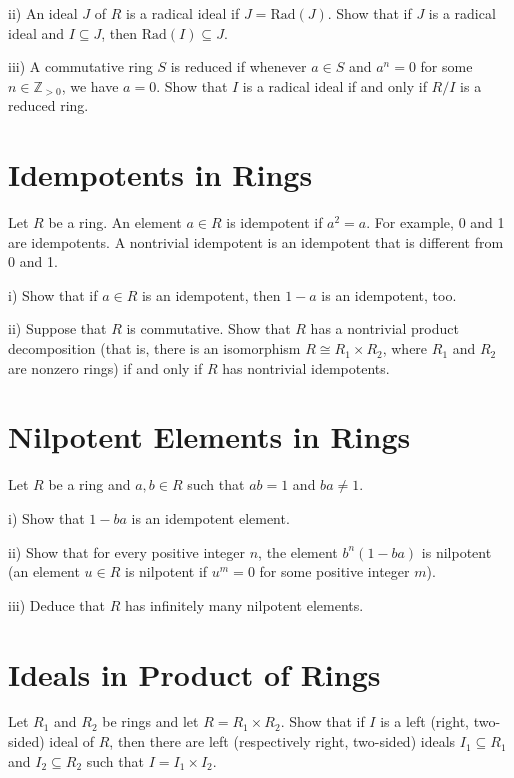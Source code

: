 \documentclass[lang=cn,11pt]{template}
\begin{document}
ii) An ideal \( J \) of \( R \) is a radical ideal if \( J = \text{Rad}(J) \). Show that if \( J \) is a radical ideal and \( I \subseteq J \), then \( \text{Rad}(I) \subseteq J \).

iii) A commutative ring \( S \) is reduced if whenever \( a \in S \) and \( a^n = 0 \) for some \( n \in \mathbb{Z}_{>0} \), we have \( a = 0 \). Show that \( I \) is a radical ideal if and only if \( R/I \) is a reduced ring.

\section{Idempotents in Rings}
Let \( R \) be a ring. An element \( a \in R \) is idempotent if \( a^2 = a \). For example, 0 and 1 are idempotents. A nontrivial idempotent is an idempotent that is different from 0 and 1.

i) Show that if \( a \in R \) is an idempotent, then \( 1 - a \) is an idempotent, too.

ii) Suppose that \( R \) is commutative. Show that \( R \) has a nontrivial product decomposition (that is, there is an isomorphism \( R \cong R_1 \times R_2 \), where \( R_1 \) and \( R_2 \) are nonzero rings) if and only if \( R \) has nontrivial idempotents.

\section{Nilpotent Elements in Rings}
Let \( R \) be a ring and \( a, b \in R \) such that \( ab = 1 \) and \( ba \neq 1 \).

i) Show that \( 1 - ba \) is an idempotent element.

ii) Show that for every positive integer \( n \), the element \( b^n(1 - ba) \) is nilpotent (an element \( u \in R \) is nilpotent if \( u^m = 0 \) for some positive integer \( m \)).

iii) Deduce that \( R \) has infinitely many nilpotent elements.

\section{Ideals in Product of Rings}
Let \( R_1 \) and \( R_2 \) be rings and let \( R = R_1 \times R_2 \). Show that if \( I \) is a left (right, two-sided) ideal of \( R \), then there are left (respectively right, two-sided) ideals \( I_1 \subseteq R_1 \) and \( I_2 \subseteq R_2 \) such that \( I = I_1 \times I_2 \).
\end{document}
